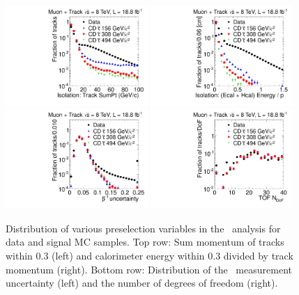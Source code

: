 \begin{figure}
\centering
  \includegraphics[clip=false, trim=0.0cm 0cm 0.0cm 0cm, width=0.48\textwidth]{figures/tkmu/Selection_Comp_8TeV_GMStau_IsolT_BS}
  \includegraphics[clip=false, trim=0.0cm 0cm 0.0cm 0cm, width=0.48\textwidth]{figures/tkmu/Selection_Comp_8TeV_GMStau_IsolE_BS} \\
  \includegraphics[clip=false, trim=0.0cm 0cm 0.0cm 0cm, width=0.48\textwidth]{figures/tkmu/Selection_Comp_8TeV_GMStau_TOFError_BS}
  \includegraphics[clip=false, trim=0.0cm 0cm 0.0cm 0cm, width=0.48\textwidth]{figures/tkmu/Selection_Comp_8TeV_GMStau_nDof_BS}
  \caption[Distribution of tracker and calorimeter isolation as well as the \invbeta\ measurement number of degrees of freedom and uncertainty
in the \tktof\ analysis for data and signal MC samples.]
{Distribution of various preselection variables in the \tktof\ analysis for data and signal MC samples.
Top row: Sum momentum of tracks within 0.3 (left) and calorimeter energy within 0.3 divided by track momentum (right).
Bottom row: Distribution of the \invbeta\ measurement uncertainty (left) and the number of degrees of freedom (right).}
    \label{fig:TkMuPreselC}
\end{figure}


